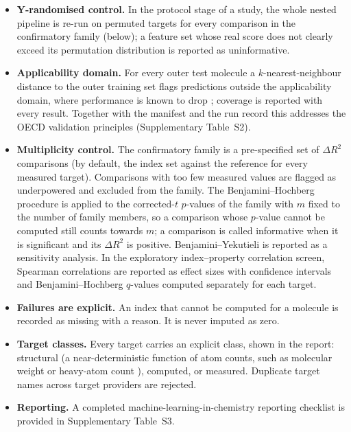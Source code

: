 \documentclass[preprint,12pt]{elsarticle}
\begin{document}
\begin{itemize}
  \item \textbf{Y-randomised control.} In the protocol stage of a study, the whole nested pipeline is re-run on permuted targets \cite{rucker2007yrandomization} for every comparison in the confirmatory family (below); a feature set whose real score does not clearly exceed its permutation distribution is reported as uninformative.
  \item \textbf{Applicability domain.} For every outer test molecule a $k$-nearest-neighbour distance to the outer training set flags predictions outside the applicability domain, where performance is known to drop \cite{netzeva2005current,alshehade2026benchmarking}; coverage is reported with every result. Together with the manifest and the run record this addresses the OECD validation principles \cite{oecd2014guidance} (Supplementary Table~S2).
  \item \textbf{Multiplicity control.} The confirmatory family is a pre-specified set of $\Delta R^2$ comparisons (by default, the index set against the reference for every measured target). Comparisons with too few measured values are flagged as underpowered and excluded from the family. The Benjamini--Hochberg procedure \cite{benjamini1995} is applied to the corrected-$t$ $p$-values of the family with $m$ fixed to the number of family members, so a comparison whose $p$-value cannot be computed still counts towards $m$; a comparison is called informative when it is significant and its $\Delta R^2$ is positive. Benjamini--Yekutieli \cite{benjamini2001} is reported as a sensitivity analysis. In the exploratory index--property correlation screen, Spearman correlations are reported as effect sizes with confidence intervals and Benjamini--Hochberg $q$-values computed separately for each target.
  \item \textbf{Failures are explicit.} An index that cannot be computed for a molecule is recorded as missing with a reason. It is never imputed as zero.
  \item \textbf{Target classes.} Every target carries an explicit class, shown in the report: structural (a near-deterministic function of atom counts, such as molecular weight or heavy-atom count \cite{colakoglu2026bipolar}), computed, or measured. Duplicate target names across target providers are rejected.
  \item \textbf{Reporting.} A completed machine-learning-in-chemistry reporting checklist \cite{artrith2021best} is provided in Supplementary Table~S3.
\end{itemize}
\end{document}
